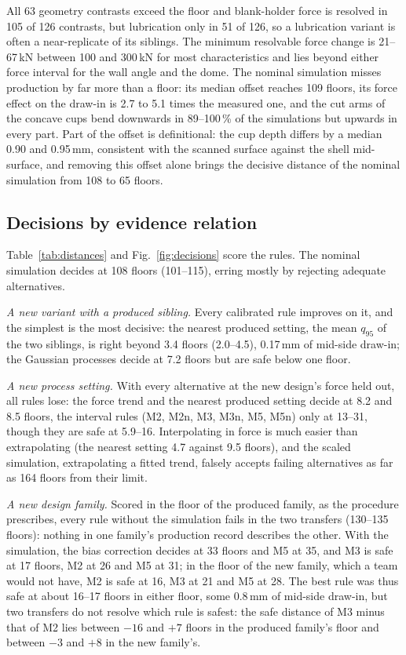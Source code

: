 \documentclass[pdflatex,sn-basic,lineno]{sn-jnl}
\begin{document}
All 63 geometry contrasts exceed the floor and blank-holder force is resolved in 105 of 126 contrasts, but lubrication only in 51 of 126, so a lubrication variant is often a near-replicate of its siblings. The minimum resolvable force change is 21--67\,kN between 100 and 300\,kN for most characteristics and lies beyond either force interval for the wall angle and the dome. The nominal simulation misses production by far more than a floor: its median offset reaches 109 floors, its force effect on the draw-in is 2.7 to 5.1 times the measured one, and the cut arms of the concave cups bend downwards in 89--100\,\% of the simulations but upwards in every part. Part of the offset is definitional: the cup depth differs by a median 0.90 and 0.95\,mm, consistent with the scanned surface against the shell mid-surface, and removing this offset alone brings the decisive distance of the nominal simulation from 108 to 65 floors.

\subsection{Decisions by evidence relation}\label{sec:res-decisions}

Table~\ref{tab:distances} and Fig.~\ref{fig:decisions} score the rules. The nominal simulation decides at 108 floors (101--115), erring mostly by rejecting adequate alternatives.

\emph{A new variant with a produced sibling.} Every calibrated rule improves on it, and the simplest is the most decisive: the nearest produced setting, the mean $q_{95}$ of the two siblings, is right beyond 3.4 floors (2.0--4.5), 0.17\,mm of mid-side draw-in; the Gaussian processes decide at 7.2 floors but are safe below one floor.

\emph{A new process setting.} With every alternative at the new design's force held out, all rules lose: the force trend and the nearest produced setting decide at 8.2 and 8.5 floors, the interval rules (M2, M2n, M3, M3n, M5, M5n) only at 13--31, though they are safe at 5.9--16. Interpolating in force is much easier than extrapolating (the nearest setting 4.7 against 9.5 floors), and the scaled simulation, extrapolating a fitted trend, falsely accepts failing alternatives as far as 164 floors from their limit.

\emph{A new design family.} Scored in the floor of the produced family, as the procedure prescribes, every rule without the simulation fails in the two transfers (130--135 floors): nothing in one family's production record describes the other. With the simulation, the bias correction decides at 33 floors and M5 at 35, and M3 is safe at 17 floors, M2 at 26 and M5 at 31; in the floor of the new family, which a team would not have, M2 is safe at 16, M3 at 21 and M5 at 28. The best rule was thus safe at about 16--17 floors in either floor, some 0.8\,mm of mid-side draw-in, but two transfers do not resolve which rule is safest: the safe distance of M3 minus that of M2 lies between $-16$ and $+7$ floors in the produced family's floor and between $-3$ and $+8$ in the new family's.
\end{document}
